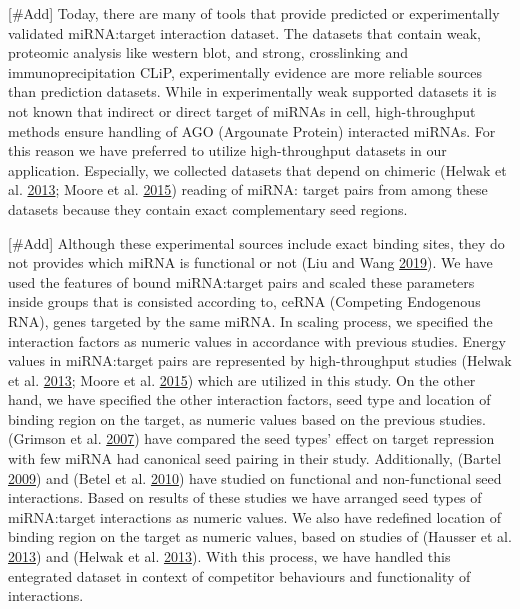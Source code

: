 \documentclass[]{article}
\begin{document}
{[}\#Add{]} Today, there are many of tools that provide predicted or
experimentally validated miRNA:target interaction dataset. The datasets
that contain weak, proteomic analysis like western blot, and strong,
crosslinking and immunoprecipitation CLiP, experimentally evidence are
more reliable sources than prediction datasets. While in experimentally
weak supported datasets it is not known that indirect or direct target
of miRNAs in cell, high-throughput methods ensure handling of AGO
(Argounate Protein) interacted miRNAs. For this reason we have preferred
to utilize high-throughput datasets in our application. Especially, we
collected datasets that depend on chimeric (Helwak et al.
\protect\hyperlink{ref-helwak_mapping_2013}{2013}; Moore et al.
\protect\hyperlink{ref-moore_mirnatarget_2015}{2015}) reading of miRNA:
target pairs from among these datasets because they contain exact
complementary seed regions.

{[}\#Add{]} Although these experimental sources include exact binding
sites, they do not provides which miRNA is functional or not (Liu and
Wang \protect\hyperlink{ref-liu2019prediction}{2019}). We have used the
features of bound miRNA:target pairs and scaled these parameters inside
groups that is consisted according to, ceRNA (Competing Endogenous RNA),
genes targeted by the same miRNA. In scaling process, we specified the
interaction factors as numeric values in accordance with previous
studies. Energy values in miRNA:target pairs are represented by
high-throughput studies (Helwak et al.
\protect\hyperlink{ref-helwak_mapping_2013}{2013}; Moore et al.
\protect\hyperlink{ref-moore_mirnatarget_2015}{2015}) which are utilized
in this study. On the other hand, we have specified the other
interaction factors, seed type and location of binding region on the
target, as numeric values based on the previous studies.(Grimson et al.
\protect\hyperlink{ref-grimson_microrna_2007}{2007}) have compared the
seed types' effect on target repression with few miRNA had canonical
seed pairing in their study. Additionally, (Bartel
\protect\hyperlink{ref-bartel_micrornas:_2009}{2009}) and (Betel et al.
\protect\hyperlink{ref-betel2010comprehensive}{2010}) have studied on
functional and non-functional seed interactions. Based on results of
these studies we have arranged seed types of miRNA:target interactions
as numeric values. We also have redefined location of binding region on
the target as numeric values, based on studies of (Hausser et al.
\protect\hyperlink{ref-hausser_analysis_2013}{2013}) and (Helwak et al.
\protect\hyperlink{ref-helwak_mapping_2013}{2013}). With this process,
we have handled this entegrated dataset in context of competitor
behaviours and functionality of interactions.
\end{document}
